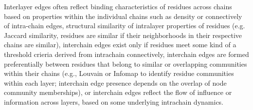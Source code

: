 \documentclass[10pt,letterpaper]{article}
\begin{document}
Interlayer edges often reflect binding characteristics of residues across chains based on properties within the individual chains such as density or connectively of intra-chain edges, structural similarity of intralayer properties of residues (e.g. Jaccard similarity, residues are similar if their neighborhoods in their respective chains are similar), interchain edges exist only if residues meet some kind of a threshold crieria derived from intrachain connectively, interchain edges are formed preferentially between residues that belong to similar or overlapping communities within their chains (e.g., Louvain or Infomap to identify residue communities within each layer; interchain edge presence depends on the overlap of node community memberships), or interchain edges reflect the flow of influence or information across layers, based on some underlying intrachain dynamics. 
\end{document}
